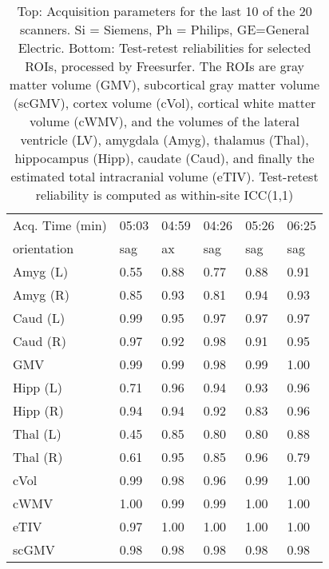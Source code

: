 \begin{table}
\begin{tabular}{llllll}
Acq. Time (min)       &           05:03 &           04:59 &           04:26 &           05:26 &           06:25 \\
orientation           &                sag &                 ax &                sag &                sag &                sag \\
Amyg (L)              &               0.55 &               0.88 &               0.77 &               0.88 &               0.91 \\
Amyg (R)              &               0.85 &               0.93 &               0.81 &               0.94 &               0.93 \\
Caud (L)              &               0.99 &               0.95 &               0.97 &               0.97 &               0.97 \\
Caud (R)              &               0.97 &               0.92 &               0.98 &               0.91 &               0.95 \\
GMV                   &               0.99 &               0.99 &               0.98 &               0.99 &               1.00 \\
Hipp (L)              &               0.71 &               0.96 &               0.94 &               0.93 &               0.96 \\
Hipp (R)              &               0.94 &               0.94 &               0.92 &               0.83 &               0.96 \\
Thal (L)              &               0.45 &               0.85 &               0.80 &               0.80 &               0.88 \\
Thal (R)              &               0.61 &               0.95 &               0.85 &               0.96 &               0.79 \\
cVol                  &               0.99 &               0.98 &               0.96 &               0.99 &               1.00 \\
cWMV                  &               1.00 &               0.99 &               0.99 &               1.00 &               1.00 \\
eTIV                  &               0.97 &               1.00 &               1.00 &               1.00 &               1.00 \\
scGMV                 &               0.98 &               0.98 &               0.98 &               0.98 &               0.98 \\
\bottomrule
\end{tabular}
\caption{Top: Acquisition parameters for the last 10 of the 20 scanners. Si = Siemens, Ph = Philips, GE=General Electric. Bottom: Test-retest reliabilities for selected ROIs, processed by Freesurfer. The ROIs are gray matter volume (GMV), subcortical gray matter volume (scGMV), cortex volume (cVol), cortical white matter volume (cWMV), and the volumes of the lateral ventricle (LV), amygdala (Amyg), thalamus (Thal), hippocampus (Hipp), caudate (Caud), and finally the estimated total intracranial volume (eTIV). Test-retest reliability is computed as within-site ICC(1,1)} 
\label{tab:acquisition2}

\end{table}